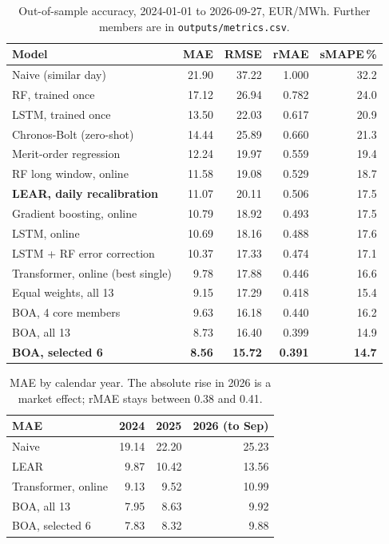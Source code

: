 \documentclass[11pt,a4paper]{article}
\begin{document}
\begin{table}[ht]
\centering\small
\begin{tabular}{lrrrr}
\toprule
Model & MAE & RMSE & rMAE & sMAPE\,\%\\
\midrule
Naive (similar day) & 21.90 & 37.22 & 1.000 & 32.2\\
RF, trained once & 17.12 & 26.94 & 0.782 & 24.0\\
LSTM, trained once & 13.50 & 22.03 & 0.617 & 20.9\\
Chronos-Bolt (zero-shot) & 14.44 & 25.89 & 0.660 & 21.3\\
Merit-order regression & 12.24 & 19.97 & 0.559 & 19.4\\
RF long window, online & 11.58 & 19.08 & 0.529 & 18.7\\
\textbf{LEAR, daily recalibration} & 11.07 & 20.11 & 0.506 & 17.5\\
Gradient boosting, online & 10.79 & 18.92 & 0.493 & 17.5\\
LSTM, online & 10.69 & 18.16 & 0.488 & 17.6\\
LSTM + RF error correction & 10.37 & 17.33 & 0.474 & 17.1\\
Transformer, online (best single) & 9.78 & 17.88 & 0.446 & 16.6\\
Equal weights, all 13 & 9.15 & 17.29 & 0.418 & 15.4\\
BOA, 4 core members & 9.63 & 16.18 & 0.440 & 16.2\\
BOA, all 13 & 8.73 & 16.40 & 0.399 & 14.9\\
\textbf{BOA, selected 6} & \textbf{8.56} & \textbf{15.72} & \textbf{0.391} & \textbf{14.7}\\
\bottomrule
\end{tabular}
\caption{Out-of-sample accuracy, 2024-01-01 to 2026-09-27, EUR/MWh. Further members are in \texttt{outputs/metrics.csv}.}
\label{tab:point}
\end{table}

\begin{table}[ht]
\centering\small
\begin{tabular}{lrrr}
\toprule
MAE & 2024 & 2025 & 2026 (to Sep)\\
\midrule
Naive & 19.14 & 22.20 & 25.23\\
LEAR & 9.87 & 10.42 & 13.56\\
Transformer, online & 9.13 & 9.52 & 10.99\\
BOA, all 13 & 7.95 & 8.63 & 9.92\\
BOA, selected 6 & 7.83 & 8.32 & 9.88\\
\bottomrule
\end{tabular}
\caption{MAE by calendar year. The absolute rise in 2026 is a market effect; rMAE stays between 0.38 and 0.41.}
\label{tab:year}
\end{table}
\end{document}
